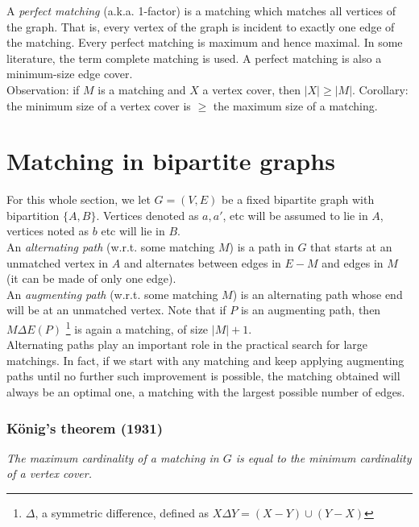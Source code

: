 \documentclass[11pt]{book}
\begin{document}
A \textit{perfect matching} (a.k.a. 1-factor) is a matching which matches all vertices of the graph. That is, every vertex of the graph is incident to exactly one edge of the matching. Every perfect matching is maximum and hence maximal. In some literature, the term complete matching is used. A perfect matching is also a minimum-size edge cover. \\

Observation: if $M$ is a matching and $X$ a vertex cover, then $|X| \geq |M|$. Corollary: the minimum size of a vertex cover is $\geq$ the maximum size of a matching.

\section{Matching in bipartite graphs}
For this whole section, we let $G = (V, E)$ be a fixed bipartite graph with bipartition $\{A, B \}$. Vertices denoted as $a, a'$, etc will be assumed to lie in $A$, vertices noted as $b$ etc will lie in $B$.\\

An \textit{alternating path} (w.r.t. some matching $M$) is a path in $G$ that starts at an unmatched vertex in $A$ and alternates between edges in $E-M$ and edges in $M$ (it can be made of only one edge).\\

An \textit{augmenting path} (w.r.t. some matching $M$) is an alternating path whose end will be at an unmatched vertex. Note that if $P$ is an augmenting path, then $M \Delta E(P)$ \footnote{$\Delta$, a symmetric difference, defined as $X \Delta Y = (X-Y) \cup (Y-X)$} is again a matching, of size $|M| + 1$. \\

Alternating paths play an important role in the practical search for large matchings. In fact, if we start with any matching and keep applying augmenting paths until no further such improvement is possible, the matching obtained will always be an optimal one, a matching with the largest possible number of edges.

\subsubsection{König's theorem (1931)} 

\textit{The maximum cardinality of a matching in $G$ is equal to the minimum cardinality of a vertex cover.}\\
\end{document}
